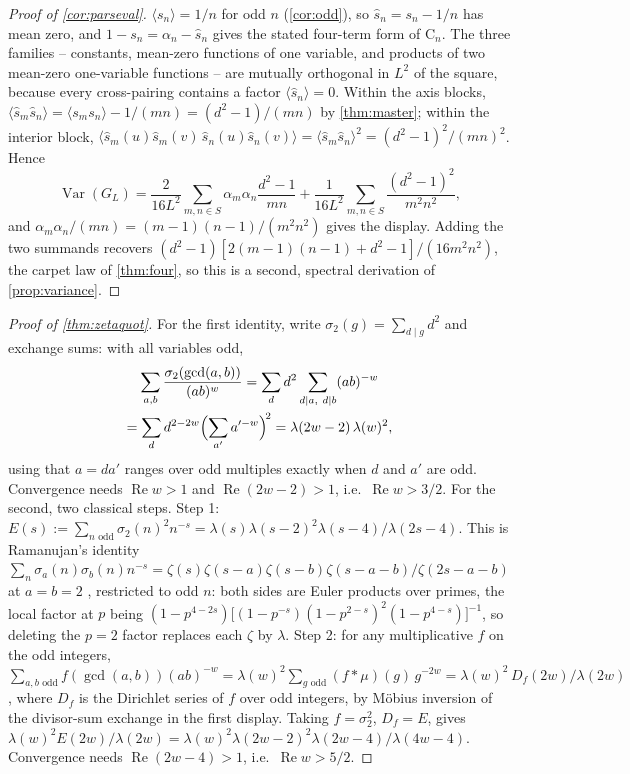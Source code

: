 \documentclass[11pt]{amsart}
\theoremstyle{definition}
\theoremstyle{remark}
\begin{document}
\begin{proof}[Proof of \cref{cor:parseval}]
$\langle s_n \rangle = 1/n$ for odd $n$ (\cref{cor:odd}), so $\widehat{s}_n = s_n - 1/n$ has mean zero, and $1 - s_n = \alpha_n - \widehat{s}_n$ gives the stated four-term form of $\mathrm{C}_n$. The three families -- constants, mean-zero functions of one variable, and products of two mean-zero one-variable functions -- are mutually orthogonal in $L^2$ of the square, because every cross-pairing contains a factor $\langle \widehat{s}_n \rangle = 0$. Within the axis blocks, $\langle \widehat{s}_m \widehat{s}_n \rangle = \langle s_m s_n \rangle - 1/(mn) = (d^2-1)/(mn)$ by \cref{thm:master}; within the interior block, $\langle \widehat{s}_m(u)\widehat{s}_m(v)\, \widehat{s}_n(u)\widehat{s}_n(v) \rangle = \langle \widehat{s}_m \widehat{s}_n \rangle^2 = (d^2-1)^2/(mn)^2$. Hence
\[
\operatorname{Var}(G_L) = \frac{2}{16L^2}\sum_{m,n \in S} \alpha_m \alpha_n \frac{d^2-1}{mn} + \frac{1}{16L^2}\sum_{m,n \in S} \frac{(d^2-1)^2}{m^2n^2},
\]
and $\alpha_m \alpha_n / (mn) = (m-1)(n-1)/(m^2n^2)$ gives the display. Adding the two summands recovers $(d^2-1)[2(m-1)(n-1) + d^2 - 1]/(16m^2n^2)$, the carpet law of \cref{thm:four}, so this is a second, spectral derivation of \cref{prop:variance}.
\end{proof}

\begin{proof}[Proof of \cref{thm:zetaquot}]
For the first identity, write $\sigma_2(g) = \sum_{d \mid g} d^2$ and exchange sums: with all variables odd,
\begin{multline*}
\sum_{a,b} \frac{\sigma_2(\gcd(a,b))}{(ab)^w} = \sum_{d} d^2 \sum_{d \mid a,\ d \mid b} (ab)^{-w} \\
= \sum_d d^{2-2w} \Bigl( \sum_{a'} a'^{-w} \Bigr)^{\!2} = \lambda(2w-2)\, \lambda(w)^2,
\end{multline*}
using that $a = da'$ ranges over odd multiples exactly when $d$ and $a'$ are odd. Convergence needs $\operatorname{Re} w > 1$ and $\operatorname{Re}(2w-2) > 1$, i.e.\ $\operatorname{Re} w > 3/2$.
For the second, two classical steps. Step 1: $E(s) := \sum_{n \text{ odd}} \sigma_2(n)^2 n^{-s} = \lambda(s)\lambda(s-2)^2\lambda(s-4)/\lambda(2s-4)$. This is Ramanujan's identity $\sum_n \sigma_a(n)\sigma_b(n) n^{-s} = \zeta(s)\zeta(s-a)\zeta(s-b)\zeta(s-a-b)/\zeta(2s-a-b)$ at $a = b = 2$ \cite{ramanujan,titchmarsh}, restricted to odd $n$: both sides are Euler products over primes, the local factor at $p$ being $(1 - p^{4-2s})\bigl[(1-p^{-s})(1-p^{2-s})^2(1-p^{4-s})\bigr]^{-1}$, so deleting the $p = 2$ factor replaces each $\zeta$ by $\lambda$. Step 2: for any multiplicative $f$ on the odd integers, $\sum_{a,b \text{ odd}} f(\gcd(a,b))(ab)^{-w} = \lambda(w)^2 \sum_{g \text{ odd}} (f * \mu)(g)\, g^{-2w} = \lambda(w)^2\, D_f(2w)/\lambda(2w)$, where $D_f$ is the Dirichlet series of $f$ over odd integers, by M\"obius inversion of the divisor-sum exchange in the first display. Taking $f = \sigma_2^2$, $D_f = E$, gives $\lambda(w)^2 E(2w)/\lambda(2w) = \lambda(w)^2 \lambda(2w-2)^2 \lambda(2w-4)/\lambda(4w-4)$. Convergence needs $\operatorname{Re}(2w-4) > 1$, i.e.\ $\operatorname{Re} w > 5/2$.
\end{proof}
\end{document}
